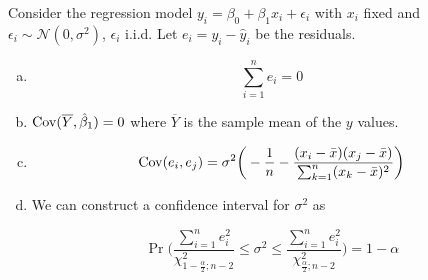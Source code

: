 \begin{proposition} Consider the regression model \(y_i = \beta_0 + \beta_1 x_i + \epsilon_i\) with \(x_i\) fixed and \(\epsilon_i \sim \mathcal{N}(0, \sigma^2)\), \(\epsilon_i\) i.i.d. Let \(e_i = y_i - \hat{y}_i\) be the residuals.

\begin{enumerate}[(a)]

\item 

\[
\sum_{i=1}^n e_i = 0
\]

\item \(\Cov(\overline{Y}, \hat{\beta}_1) =0\) where \(\overline{Y}\) is the sample mean of the \(y\) values.


\item 

\[
\Cov(e_i, e_j)  = \sigma^2\bigg(-\frac{1}{n} - \frac{ (x_i -\bar{x})(x_j - \bar{x})}{\sum_{k=1}^n(x_k - \bar{x})^2} \bigg)
\]

\item We can construct a confidence interval for \(\sigma^2\) as 

\[
 \Pr \bigg( \frac{\sum_{i=1}^n e_i^2}{\chi_{1 - \frac{\alpha}{2}; n-2}^2}  \leq \sigma^2  \leq  \frac{\sum_{i=1}^n e_i^2}{\chi_{\frac{\alpha}{2}; n-2}^2}  \bigg) = 1 - \alpha 
\]

\end{enumerate}

\end{proposition}

